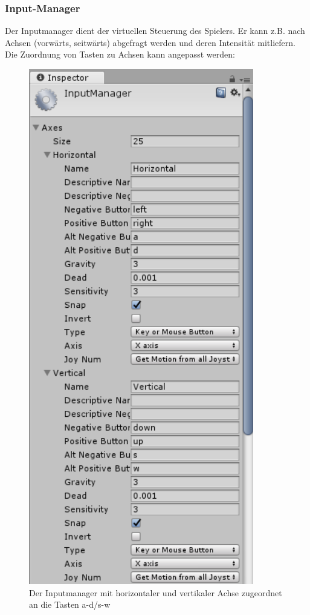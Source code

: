 \subsubsection{Input-Manager}

Der Inputmanager dient der virtuellen Steuerung des Spielers. Er kann z.B. nach Achsen (vorwärts, seitwärts) abgefragt werden und deren Intensität mitliefern.
Die Zuordnung von Tasten zu Achsen kann angepasst werden:

\begin{figure}[H]
\includegraphics[scale=0.67]{screenshots/inputaxis.png}
\caption{Der Inputmanager mit horizontaler und vertikaler Achse zugeordnet an die Tasten a-d/s-w}
\end{figure}

